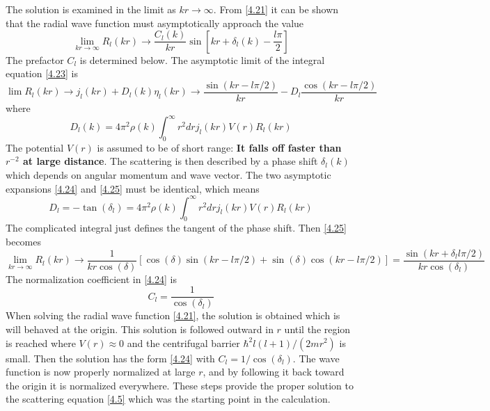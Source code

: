 The solution is examined in the limit as $kr\to \infty$.
From \eqref{4.21} it can be shown that the radial wave function must asymptotically approach the value
\begin{equation}
    \lim_{kr\to \infty} R_l(kr) \to \frac{C_l(k)}{kr} \sin \left[kr + \delta_l(k) - \frac{l\pi}{2}  \right] \label{4.24}
\end{equation}
The prefactor $C_l$ is determined below. The asymptotic limit of the integral equation \eqref{4.23} is
\begin{equation}
    \lim R_l(kr) \to j_l(kr) + D_l(k) \eta_l(kr) \to \frac{\sin(kr-l\pi/2)}{kr} - D_l \frac{\cos(kr- l\pi/2)}{kr}   \label{4.25}
\end{equation}
where
\begin{equation}
    D_l(k) = 4\pi^2 \rho(k) \int_0^\infty r^2 dr j_l(kr) V(r) R_l(kr)   \label{4.26}
\end{equation}
The potential $V(r)$ is assumed to be of short range: \textbf{It falls off faster than $r^{-2}$ at large distance}.
The scattering is then described by a phase shift $\delta_l(k)$ which depends on angular momentum and wave vector.
The two asymptotic expansions \eqref{4.24} and \eqref{4.25} must be identical, which means
\begin{equation}
    D_l = - \tan (\delta_l) = 4\pi^2 \rho(k) \int_0^\infty r^2 dr j_l(kr) V(r) R_l(kr)  \label{4.27}
\end{equation}
The complicated integral just defines the tangent of the phase shift. Then \eqref{4.25} becomes
\begin{equation}
    \lim_{kr\to\infty} R_l(kr) \to \frac{1}{kr\cos(\delta)} \left[\cos(\delta) \sin(kr-l\pi/2) + \sin(\delta) \cos(kr-l\pi/2) \right] = \frac{\sin(kr + \delta_l l\pi/2)}{kr \cos(\delta_l)} \label{4.28}
\end{equation}
The normalization coefficient in \eqref{4.24} is
\begin{equation}
    C_l = \frac{1}{\cos(\delta_l)}  \label{4.29}
\end{equation}
When solving the radial wave function \eqref{4.21}, the solution is obtained which is will behaved at the origin.
This solution is followed outward in $r$ until the region is reached where $V(r) \approx 0$ and the centrifugal barrier $\hbar^2 l (l+1)/(2mr^2)$ is small.
Then the solution has the form \eqref{4.24} with $C_l = 1/\cos(\delta_l)$.
The wave function is now properly normalized at large $r$, and by following it back toward the origin it is normalized everywhere.
These steps provide the proper solution to the scattering equation \eqref{4.5} which was the starting point in the calculation.

